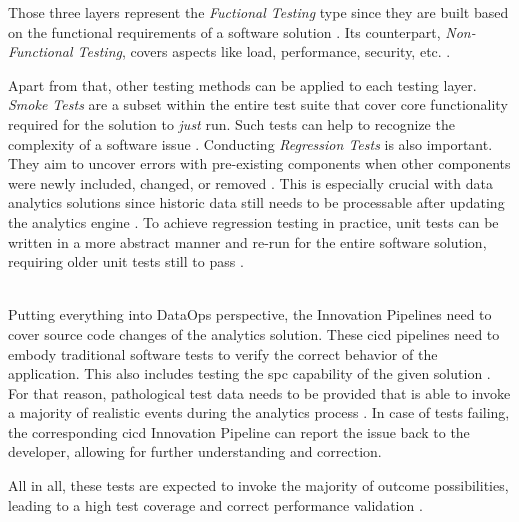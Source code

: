 Those three layers represent the \textit{Fuctional Testing} type since they are built based on the functional requirements of a software solution \cite[69]{Mahfuz2016}. Its counterpart, \textit{Non-Functional Testing}, covers aspects like load, performance, security, etc. \cite[70]{Mahfuz2016}.

Apart from that, other testing methods can be applied to each testing layer. \textit{Smoke Tests} are a subset within the entire test suite that cover core functionality required for the solution to \textit{just} run. Such tests can help to recognize the complexity of a software issue \cite[sec. 5]{Tarlinder2016}. Conducting \textit{Regression Tests} is also important. They aim to uncover errors with pre-existing components when other components were newly included, changed, or removed \cite[70]{Mahfuz2016}\cite{Mathur2013}. This is especially crucial with data analytics solutions since historic data still needs to be processable after updating the analytics engine \cite{Shen2019}. To achieve regression testing in practice, unit tests can be written in a more abstract manner and re-run for the entire software solution, requiring older unit tests still to pass \cite{Mathur2013}.
\\\

Putting everything into DataOps perspective, the Innovation Pipelines need to cover source code changes of the analytics solution. These \ac{cicd} pipelines need to embody traditional software tests to verify the correct behavior of the application. This also includes testing the \ac{spc} capability of the given solution \cite{DataKitchen2020}. For that reason, pathological test data needs to be provided that is able to invoke a majority of realistic events during the analytics process \cite[42]{Bergh2019}. In case of tests failing, the corresponding \ac{cicd} Innovation Pipeline can report the issue back to the developer, allowing for further understanding and correction.

All in all, these tests are expected to invoke the majority of outcome possibilities, leading to a high test coverage and correct performance validation \cite{DataKitchen2020a}.